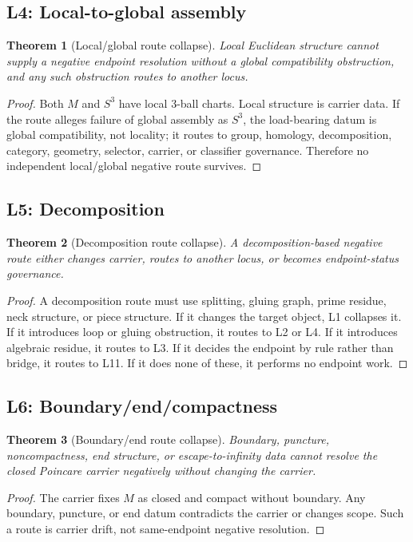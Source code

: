 \documentclass[11pt]{article}
\newtheorem{theorem}{Theorem}[section]
\newcommand{\Sthree}{S^{3}}
\begin{document}
\subsection{L4: Local-to-global assembly}
\begin{theorem}[Local/global route collapse]
Local Euclidean structure cannot supply a negative endpoint resolution without a global compatibility obstruction, and any such obstruction routes to another locus.
\end{theorem}
\begin{proof}
Both \(M\) and \(\Sthree\) have local 3-ball charts. Local structure is carrier data. If the route alleges failure of global assembly as \(\Sthree\), the load-bearing datum is global compatibility, not locality; it routes to group, homology, decomposition, category, geometry, selector, carrier, or classifier governance. Therefore no independent local/global negative route survives.
\end{proof}

\subsection{L5: Decomposition}
\begin{theorem}[Decomposition route collapse]
A decomposition-based negative route either changes carrier, routes to another locus, or becomes endpoint-status governance.
\end{theorem}
\begin{proof}
A decomposition route must use splitting, gluing graph, prime residue, neck structure, or piece structure. If it changes the target object, L1 collapses it. If it introduces loop or gluing obstruction, it routes to L2 or L4. If it introduces algebraic residue, it routes to L3. If it decides the endpoint by rule rather than bridge, it routes to L11. If it does none of these, it performs no endpoint work.
\end{proof}

\subsection{L6: Boundary/end/compactness}
\begin{theorem}[Boundary/end route collapse]
Boundary, puncture, noncompactness, end structure, or escape-to-infinity data cannot resolve the closed Poincare carrier negatively without changing the carrier.
\end{theorem}
\begin{proof}
The carrier fixes \(M\) as closed and compact without boundary. Any boundary, puncture, or end datum contradicts the carrier or changes scope. Such a route is carrier drift, not same-endpoint negative resolution.
\end{proof}
\end{document}
